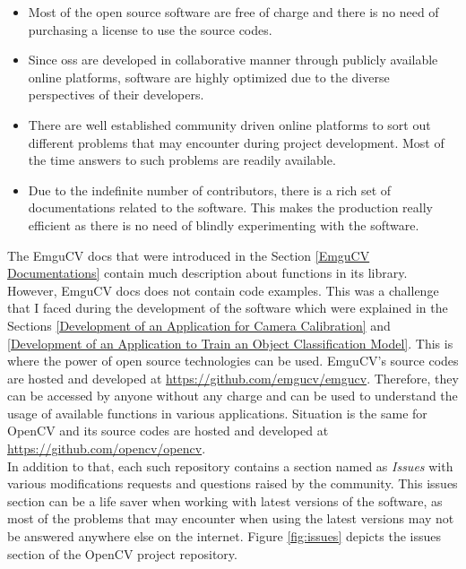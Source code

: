 \documentclass[a4paper,12pt]{report}
\begin{document}
\begin{itemize}
	\item Most of the open source software are free of charge and there is no need of purchasing a license to use the source codes.
	
	\item Since \ac{oss} are developed in collaborative manner through publicly available online platforms, software are highly optimized due to the diverse perspectives of their developers. 
	
	\item There are  well established community driven online platforms to sort out different problems that may encounter during project development. Most of the time answers to such problems are readily available.
	
	\item Due to the indefinite number of contributors, there is a rich set of documentations related to the software. This makes the production really efficient as there is no need of blindly experimenting with the software.

\end{itemize}

The EmguCV docs that were introduced in the Section \ref{EmguCV Documentations} contain much description about functions in its library.
However, EmguCV docs does not contain code examples. This was a challenge  that I faced during the development of the software which were explained in the Sections \ref{Development of an Application for Camera Calibration} and \ref{Development of an Application to Train an Object Classification Model}. This is where the power of open source technologies can be used. EmguCV's source codes are hosted and developed at \url{https://github.com/emgucv/emgucv}. Therefore, they can be accessed by anyone without any charge and can be used to understand the usage of available functions in various applications. Situation is the same for OpenCV and its source codes are hosted and developed at \url{https://github.com/opencv/opencv}.\\

In addition to that, each such repository contains a section named as \textit{Issues} with various modifications requests and questions raised by the community. This issues section can be a life saver when working with latest versions of the software, as most of the problems that may encounter when using the latest versions may not be answered anywhere else on the internet. Figure \ref{fig:issues} depicts the issues section of the OpenCV project repository.
\end{document}
